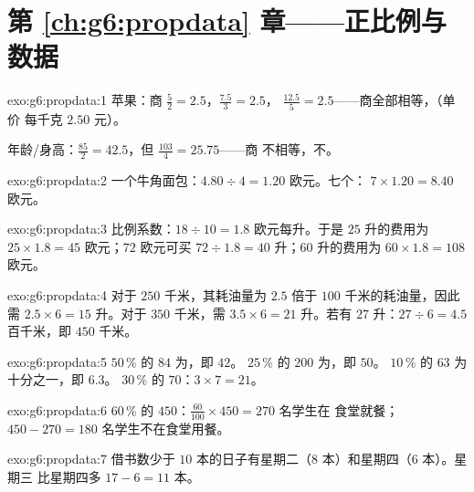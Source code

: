\section*{第 \ref{ch:g6:propdata} 章——正比例与数据}

\begin{solution}{exo:g6:propdata:1}
苹果：商 $\frac52 = 2.5$，$\frac{7.5}{3} = 2.5$，
$\frac{12.5}{5} = 2.5$——商全部相等，（单价
每千克 $2.50$ 元）。

年龄/身高：$\frac{85}{2} = 42.5$，但 $\frac{103}{4} = 25.75$——商
不相等，不。
\end{solution}

\begin{solution}{exo:g6:propdata:2}
一个牛角面包：$4.80 \div 4 = 1.20$ 欧元。七个：
$7 \times 1.20 = 8.40$ 欧元。
\end{solution}

\begin{solution}{exo:g6:propdata:3}
比例系数：$18 \div 10 = 1.8$ 欧元每升。于是
$25$ 升的费用为 $25 \times 1.8 = 45$ 欧元；$72$ 欧元可买
$72 \div 1.8 = 40$ 升；$60$ 升的费用为 $60 \times 1.8 = 108$ 欧元。
\end{solution}

\begin{solution}{exo:g6:propdata:4}
对于 $250$ 千米，其耗油量为 $2.5$ 倍于 $100$ 千米的耗油量，因此
需 $2.5 \times 6 = 15$ 升。对于 $350$ 千米，需 $3.5 \times 6 = 21$ 升。若有
$27$ 升：$27 \div 6 = 4.5$ 百千米，即 $450$ 千米。
\end{solution}

\begin{solution}{exo:g6:propdata:5}
$50\,\%$ 的 $84$ 为，即 $42$。\quad
$25\,\%$ 的 $200$ 为，即 $50$。\quad
$10\,\%$ 的 $63$ 为十分之一，即 $6.3$。\quad
$30\,\%$ 的 $70$：$3 \times 7 = 21$。
\end{solution}

\begin{solution}{exo:g6:propdata:6}
$60\,\%$ 的 $450$：$\frac{60}{100} \times 450 = 270$ 名学生在
食堂就餐；$450 - 270 = 180$ 名学生不在食堂用餐。
\end{solution}

\begin{solution}{exo:g6:propdata:7}
借书数少于 $10$ 本的日子有星期二（$8$ 本）和星期四（$6$ 本）。星期三
比星期四多 $17 - 6 = 11$ 本。
\end{solution}

